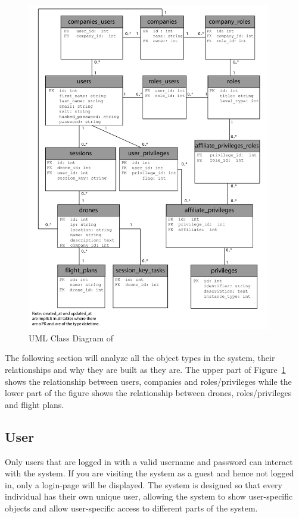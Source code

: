 \begin{figure}[htb]
    \centering
    \includegraphics[width=0.95\textwidth]{gfx/UML_model.pdf}
    \caption{UML Class Diagram of \projectname{}}
    \label{fig:UML_class_diagram}
\end{figure}

The following section will analyze all the object types in the system, their relationships and why they are built as they are.
The upper part of Figure~\ref{fig:UML_class_diagram} shows the relationship between users, companies and roles/privileges while the lower part of the figure shows the relationship between drones, roles/privileges and flight plans.


\subsection{User}
Only users that are logged in with a valid username and password can interact with the system.
If you are visiting the system as a guest and hence not logged in, only a login-page will be displayed.
The system is designed so that every individual has their own unique user, allowing the system to show user-specific objects and allow user-specific access to different parts of the system. \\


